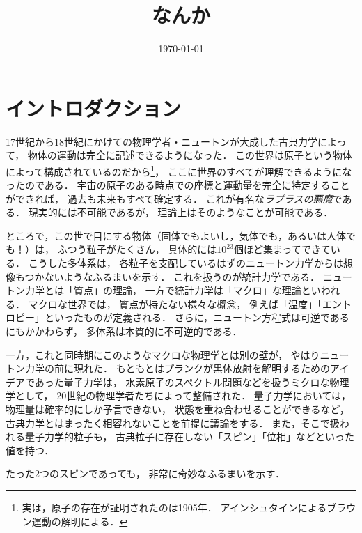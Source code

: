 \documentclass{sotsu}
\title{なんか}
\date{\today}
\begin{document}
\maketitle


\section{イントロダクション}

17世紀から18世紀にかけての物理学者・ニュートンが大成した古典力学によって，
物体の運動は完全に記述できるようになった．
この世界は原子という物体によって構成されているのだから\footnote{
    実は，原子の存在が証明されたのは1905年．
    アインシュタインによるブラウン運動の解明による．
}，
ここに世界のすべてが理解できるようになったのである．
宇宙の原子のある時点での座標と運動量を完全に特定することができれば，
過去も未来もすべて確定する．
これが有名な\emph{ラプラスの悪魔}である．
現実的には不可能であるが，
理論上はそのようなことが可能である．

ところで，この世で目にする物体（固体でもよいし，気体でも，あるいは人体でも！）は，
ふつう粒子がたくさん，
具体的には$10^{23}$個ほど集まってできている．
こうした多体系は，
各粒子を支配しているはずのニュートン力学からは想像もつかないようなふるまいを示す．
これを扱うのが統計力学である．
ニュートン力学とは「質点」の理論，
一方で統計力学は「マクロ」な理論といわれる．
マクロな世界では，
質点が持たない様々な概念，
例えば「温度」「エントロピー」といったものが定義される．
さらに，ニュートン方程式は可逆であるにもかかわらず，
多体系は本質的に不可逆的である．

一方，これと同時期にこのようなマクロな物理学とは別の壁が，
やはりニュートン力学の前に現れた．
もともとはプランクが黒体放射を解明するためのアイデアであった量子力学は，
水素原子のスペクトル問題などを扱うミクロな物理学として，
20世紀の物理学者たちによって整備された．
量子力学においては，
物理量は確率的にしか予言できない，
状態を重ね合わせることができるなど，
古典力学とはまったく相容れないことを前提に議論をする．
また，そこで扱われる量子力学的粒子も，
古典粒子に存在しない「スピン」「位相」などといった値を持つ．

たった2つのスピンであっても，
非常に奇妙なふるまいを示す．
\end{document}
